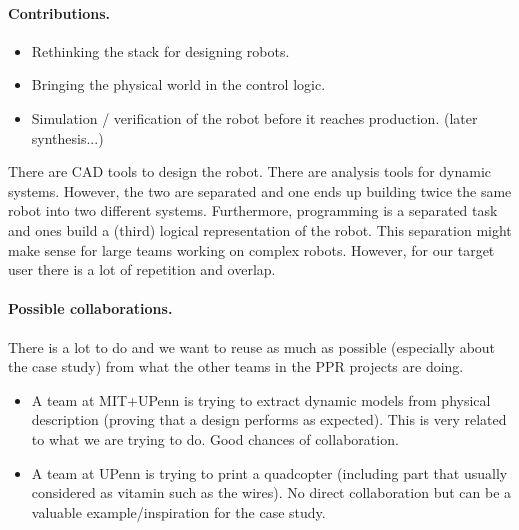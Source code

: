 \paragraph{Contributions.}
\begin{itemize}
\item Rethinking the stack for designing robots.
\item Bringing the physical world in the control logic.
\item Simulation / verification of the robot before it reaches production. (later synthesis...)
\end{itemize}

There are CAD tools to design the robot.
There are analysis tools for dynamic systems.
However, the two are separated and one ends up building twice the same robot into two different systems.
Furthermore, programming is a separated task and ones build a (third) logical representation of the robot.
This separation might make sense for large teams working on complex robots.
However, for our target user there is a lot of repetition and overlap.

\paragraph{Possible collaborations.}
There is a lot to do and we want to reuse as much as possible (especially about the case study) from what the other teams in the PPR projects are doing.
\begin{itemize}
\item A team at MIT+UPenn is trying to extract dynamic models from physical description (proving that a design performs as expected). This is very related to what we are trying to do. Good chances of collaboration.
\item A team at UPenn is trying to print a quadcopter (including part that usually considered as vitamin such as the wires). No direct collaboration but can be a valuable example/inspiration for the case study.
\end{itemize}

